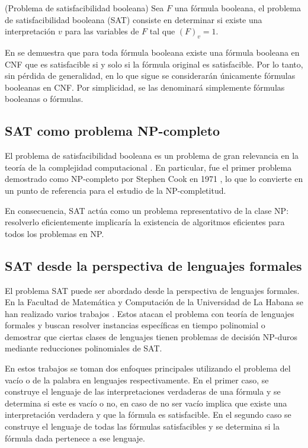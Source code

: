\begin{definition}{(Problema de satisfacibilidad booleana)}
	Sea $F$ una fórmula booleana, el problema de satisfacibilidad booleana (SAT) consiste en determinar si existe una interpretación $v$ para las variables de $F$ tal que $(F)_v = 1$.
\end{definition}


En \cite{automataTheory} se demuestra que para toda fórmula booleana existe una fórmula booleana en CNF que es satisfacible si y solo si la fórmula original es satisfacible. Por lo tanto, sin pérdida de generalidad, en lo que sigue se considerarán únicamente fórmulas booleanas en CNF. Por simplicidad, se las denominará simplemente fórmulas booleanas o fórmulas.


\subsection{SAT como problema NP-completo}

El problema de satisfacibilidad booleana es un problema de gran relevancia en la teoría de la complejidad computacional \cite{automataTheory}. En particular, fue el primer problema demostrado como NP-completo por Stephen Cook en 1971 \cite{Cook1971}, lo que lo convierte en un punto de referencia para el estudio de la NP-completitud.

En consecuencia, SAT actúa como un problema representativo de la clase NP: resolverlo eficientemente implicaría la existencia de algoritmos eficientes para todos los problemas en NP.

\subsection{SAT desde la perspectiva de lenguajes formales}

El problema SAT puede ser abordado desde la perspectiva de lenguajes formales. En la Facultad de Matemática y Computación de la Universidad de La Habana se han realizado varios trabajos \cite{aCFSAT, aSRCSAT, RCGSAT, MSAT}. Estos atacan el problema con teoría de lenguajes formales y buscan resolver instancias específicas en tiempo polinomial o demostrar que ciertas clases de lenguajes tienen problemas de decisión NP-duros mediante reducciones polinomiales de SAT.

En estos trabajos se toman dos enfoques principales utilizando el problema del vacío o de la palabra en lenguajes respectivamente. En el primer caso, se construye el lenguaje de las interpretaciones verdaderas de una fórmula y se determina si este es vacío o no, en caso de no ser vacío implica que existe una interpretación verdadera y que la fórmula es satisfacible. En el segundo caso se construye el lenguaje de todas las fórmulas satisfacibles y se determina si la fórmula dada pertenece a ese lenguaje.

